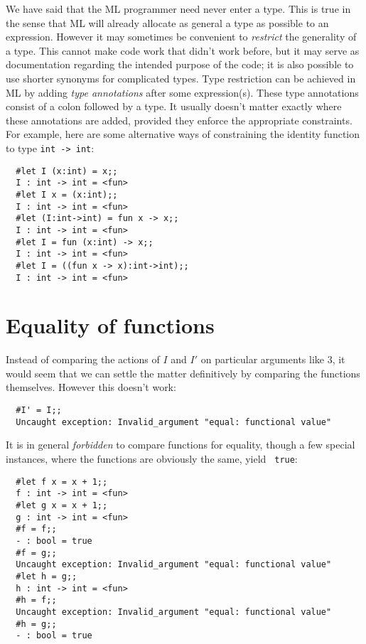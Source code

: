 We have said that the ML programmer need never enter a type. This is true in
the sense that ML will already allocate as general a type as possible to an
expression. However it may sometimes be convenient to {\em restrict} the
generality of a type. This cannot make code work that didn't work before, but
it may serve as documentation regarding the intended purpose of the code; it is
also possible to use shorter synonyms for complicated types. Type restriction
can be achieved in ML by adding {\em type annotations} after some
expression(s). These type annotations consist of a colon followed by a type. It
usually doesn't matter exactly where these annotations are added, provided they
enforce the appropriate constraints. For example, here are some alternative
ways of constraining the identity function to type {\tt int -> int}:

\begin{boxed}\begin{verbatim}
  #let I (x:int) = x;;
  I : int -> int = <fun>
  #let I x = (x:int);;
  I : int -> int = <fun>
  #let (I:int->int) = fun x -> x;;
  I : int -> int = <fun>
  #let I = fun (x:int) -> x;;
  I : int -> int = <fun>
  #let I = ((fun x -> x):int->int);;
  I : int -> int = <fun>
\end{verbatim}\end{boxed}

\section{Equality of functions}

Instead of comparing the actions of $I$ and $I'$ on particular arguments like
$3$, it would seem that we can settle the matter definitively by comparing the
functions themselves. However this doesn't work:

\begin{boxed}\begin{verbatim}
  #I' = I;;
  Uncaught exception: Invalid_argument "equal: functional value"
\end{verbatim}\end{boxed}

It is in general {\em forbidden} to compare functions for equality, though a
few special instances, where the functions are obviously the same, yield {\tt
true}:

\begin{boxed}\begin{verbatim}
  #let f x = x + 1;;
  f : int -> int = <fun>
  #let g x = x + 1;;
  g : int -> int = <fun>
  #f = f;;
  - : bool = true
  #f = g;;
  Uncaught exception: Invalid_argument "equal: functional value"
  #let h = g;;
  h : int -> int = <fun>
  #h = f;;
  Uncaught exception: Invalid_argument "equal: functional value"
  #h = g;;
  - : bool = true
\end{verbatim}\end{boxed}

